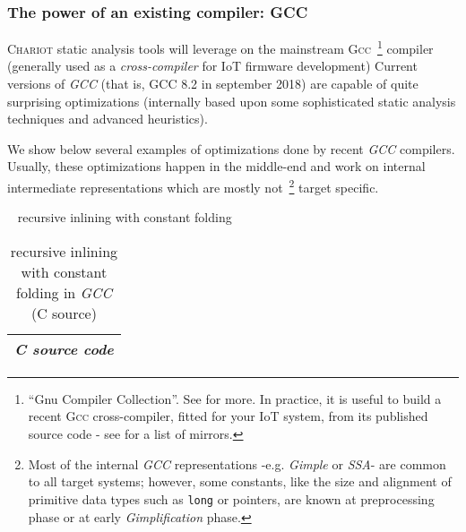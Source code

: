 \subsubsection{The power of an existing compiler: GCC}

\textsc{Chariot} static analysis tools will leverage on the mainstream
\textsc{Gcc}~\footnote{``Gnu Compiler Collection''. See  for more. In
  practice, it is useful to build a recent \textsc{Gcc}
  cross-compiler, fitted for your IoT system, from its published
  source code - see  for a
  list of mirrors.} compiler (generally used as a
\emph{cross-compiler} for IoT
firmware development) Current versions of \emph{GCC} (that is, GCC 8.2
in september 2018) are capable of quite surprising optimizations
(internally based upon some sophisticated static analysis techniques
and advanced heuristics).


We show below several examples of optimizations done by recent
\emph{GCC} compilers. Usually, these optimizations happen in the
middle-end and work on internal intermediate representations which are
mostly not~\footnote{Most of the internal \emph{GCC} representations
  -e.g. \emph{Gimple} or \emph{SSA}- are common to all target systems;
  however, some constants, like the size and alignment of primitive
  data types such as \texttt{long} or pointers, are known at
  preprocessing phase or at early \emph{Gimplification} phase.} target
specific.

\bigskip

{{\raisebox{3pt}{\textcolor{brown}{\rule{0.2\textwidth}{2.0pt}}}} ~ \large{recursive inlining with constant folding}}


\begin{table}[t]
\caption{\label{tab:factinlinecsrc} recursive inlining with constant folding in \emph{GCC} (C source)}
   \medskip
  \begin{center}
    \begin{relsize}{-1.2}
     \begin{tabular}{c}
       \\ 
       \textbf{\emph{C source code}} \\ 
       \hline
     \end{tabular}
    \end{relsize}
  \end{center}
\end{table}

